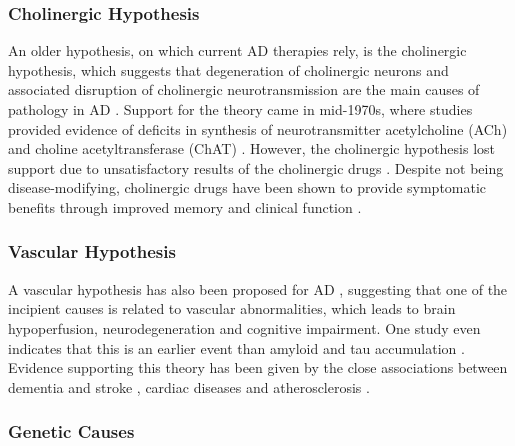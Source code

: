 \subsubsection{Cholinergic Hypothesis}
\label{sec:bckChoHyp}

An older hypothesis, on which current AD therapies rely, is the cholinergic hypothesis, which suggests that degeneration of cholinergic neurons and associated disruption of cholinergic neurotransmission are the main causes of pathology in AD \cite{francis1999cholinergic}. Support for the theory came in mid-1970s, where studies provided evidence of deficits in synthesis of neurotransmitter acetylcholine (ACh) and choline acetyltransferase (ChAT) \cite{davies1976selective}. However, the cholinergic hypothesis lost support due to unsatisfactory results of the cholinergic drugs \cite{martorana2010beyond}. Despite not being disease-modifying, cholinergic drugs have been shown to provide symptomatic benefits through improved memory and clinical function \cite{martorana2010beyond}.

\subsubsection{Vascular Hypothesis}
\label{sec:bckVasHyp}

A vascular hypothesis has also been proposed for AD \cite{de2004alzheimer}, suggesting that one of the incipient causes is related to vascular abnormalities, which leads to brain hypoperfusion, neurodegeneration and cognitive impairment. One study even indicates that this is an earlier event than amyloid and tau accumulation \cite{iturria2016early}. Evidence supporting this theory has been given by the close associations between dementia and stroke \cite{kalaria2003vascular,meyer2000risk}, cardiac diseases \cite{breteler2000vascular,aronson1990women,polidori2001heart} and atherosclerosis \cite{hofman1997atherosclerosis}.

\subsubsection{Genetic Causes}
\label{sec:bckGen}


